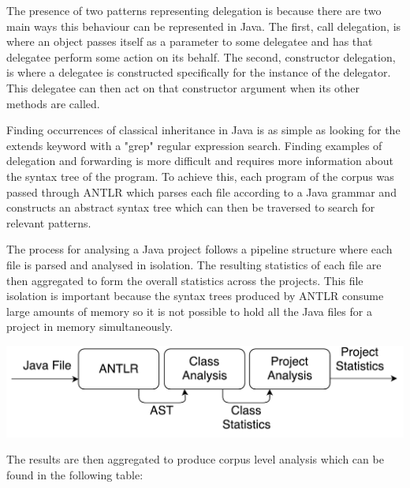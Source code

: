 The presence of two patterns representing delegation is because there are two main ways this behaviour can be represented in Java. The first, call delegation, is where an object passes itself as a parameter to some delegatee and has that delegatee perform some action on its behalf. The second, constructor delegation, is where a delegatee is constructed specifically for the instance of the delegator. This delegatee can then act on that constructor argument when its other methods are called.
\newline

Finding occurrences of classical inheritance in Java is as simple as looking for the extends keyword with a "grep" regular expression search. Finding examples of delegation and forwarding is more difficult and requires more information about the syntax tree of the program. To achieve this, each program of the corpus was passed through ANTLR which parses each file according to a Java grammar and constructs an abstract syntax tree which can then be traversed to search for relevant patterns.
\newline

The process for analysing a Java project follows a pipeline structure where each file is parsed and analysed in isolation. The resulting statistics of each file are then aggregated to form the overall statistics across the projects. This file isolation is important because the syntax trees produced by ANTLR consume large amounts of memory so it is not possible to hold all the Java files for a project in memory simultaneously.
\newline

\begin{center}
	\includegraphics[scale=0.70]{AntlrPipeline.pdf}
\end{center}

The results are then aggregated to produce corpus level analysis which can be found in the following table:

